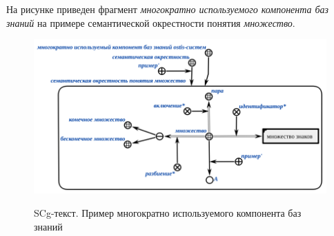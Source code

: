 На рисунке \textit{} приведен фрагмент \textit{многократно используемого компонента баз знаний} на примере семантической окрестности понятия \textit{множество}.

\begin{figure}[H]
	\caption{SCg-текст. Пример многократно используемого компонента баз знаний}
	\includegraphics[scale=0.6]{author/part5/figures/set_neighbourhood.png}
	\label{fig:set_neighbourhood}
\end{figure}

